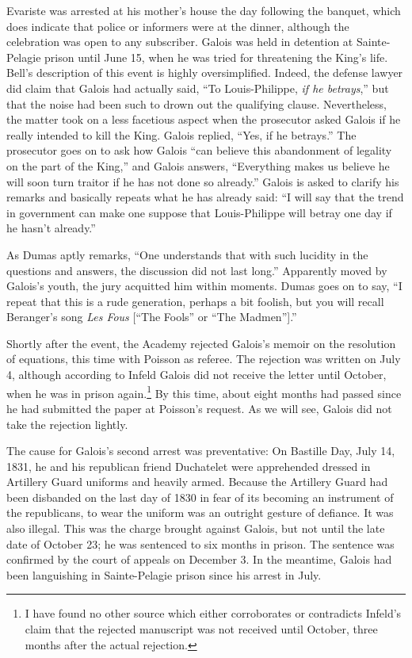 \documentclass[12pt]{article}
\begin{document}
Evariste was arrested at his mother's house the day following the banquet, which does indicate that police or informers were at the dinner, although the celebration was open to any subscriber. Galois was held in detention at Sainte-Pelagie prison until June 15, when he was tried for threatening the King's life. Bell's description of this event is highly oversimplified. Indeed, the defense lawyer did claim that Galois had actually said, ``To Louis-Philippe, {\it if he betrays},'' but that the noise had been such to drown out the qualifying clause. Nevertheless, the matter took on a less facetious aspect when the prosecutor asked Galois if he really intended to kill the King. Galois replied, ``Yes, if he betrays.'' The prosecutor goes on to ask how Galois ``can believe this abandonment of legality on the part of the King,'' and Galois answers, ``Everything makes us believe he will soon turn traitor if he has not done so already.'' Galois is asked to clarify his remarks and basically repeats what he has already said: ``I will say that the trend in government can make one suppose that Louis-Philippe will betray one day if he hasn't already.''

As Dumas aptly remarks, ``One understands that with such lucidity in the questions and answers, the discussion did not last long.'' Apparently moved by Galois's youth, the jury acquitted him within moments. Dumas goes on to say, ``I repeat that this is a rude generation, perhaps a bit foolish, but you will recall Beranger's song \emph{Les Fous} [``The Fools'' or ``The Madmen''].'' \cite{55}

Shortly after the event, the Academy rejected Galois's memoir on the resolution of equations, this time with Poisson as referee. The rejection was written on July 4, although according to Infeld \cite{56} Galois did not receive the letter until October, when he was in prison again.\footnote{I have found no other source which either corroborates or contradicts Infeld's claim that the rejected manuscript was not received until October, three months after the actual rejection.} By this time, about eight months had passed since he had submitted the paper at Poisson's request. As we will see, Galois did not take the rejection lightly.

The cause for Galois's second arrest was preventative: On Bastille Day, July 14, 1831, he and his republican friend Duchatelet were apprehended dressed in Artillery Guard uniforms and heavily armed. Because the Artillery Guard had been disbanded on the last day of 1830 in fear of its becoming an instrument of the republicans, to wear the uniform was an outright gesture of defiance. It was also illegal. This was the charge brought against Galois, but not until the late date of October 23; he was sentenced to six months in prison. The sentence was confirmed by the court of appeals on December 3. In the meantime, Galois had been languishing in Sainte-Pelagie prison since his arrest in July.
\end{document}
